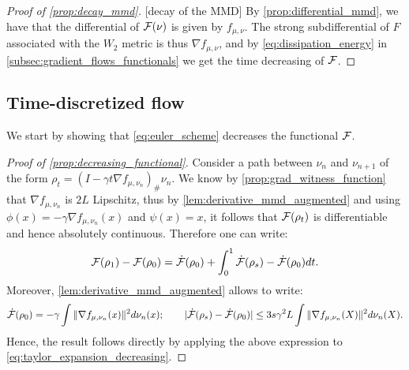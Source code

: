
\begin{proof}[Proof of \cref{prop:decay_mmd}]\label{proof:prop:decay_mmd}[decay of the MMD]
By \eqref{prop:differential_mmd}, we have that the differential of ${{\mathcal F}}(\nu)$ is given by $f_{\mu,\nu}$. The strong subdifferential of $F$ associated with the $W_2$ metric is thus $\nabla f_{\mu, \nu}$, and by \eqref{eq:dissipation_energy} in \cref{subsec:gradient_flows_functionals} we get the time decreasing of ${{\mathcal F}}$.
\end{proof}




\subsection{Time-discretized flow}\label{appendix:subsec:convegence_time_discrete}
We start by showing that \cref{eq:euler_scheme} decreases the functional ${{\mathcal F}}$.
\begin{proof}[Proof of \cref{prop:decreasing_functional}]\label{proof:prop:decreasing_functional}
	Consider a path between $\nu_n$ and $\nu_{n+1}$ of the form $\rho_t	=(I-\gamma t\nabla f_{\mu,\nu_n})_{\#}\nu_n$. We know by \cref{prop:grad_witness_function} that $\nabla f_{\mu,\nu_n}$ is $2L$ Lipschitz, thus by \cref{lem:derivative_mmd_augmented} and using $\phi(x) = -\gamma \nabla f_{\mu,\nu_n}(x)$ and $\psi(x) = x$, it follows that ${{\mathcal F}}(\rho_t)$ is differentiable and hence absolutely continuous. Therefore one can write:
	\begin{align}\label{eq:taylor_expansion_decreasing}
	\mathcal{F}(\rho_1)-\mathcal{F}(\rho_0) = \dot{\mathcal{F}}(\rho_0)+  \int_0^1 \dot{{{\mathcal F}}}(\rho_s)- \dot{{{\mathcal F}}}(\rho_0)dt.
	\end{align}
	Moreover, \cref{lem:derivative_mmd_augmented} allows to write:
	\begin{align*}
		\dot{\mathcal{F}}(\rho_0) = -\gamma \int \Vert \nabla f_{\mu,\nu_n}(x) \Vert^2 d\nu_n(x); \qquad \vert \dot{{{\mathcal F}}}(\rho_s)- \dot{{{\mathcal F}}}(\rho_0)\vert \leq 3s\gamma^2 L\int \Vert \nabla f_{\mu,\nu_n}(X) \Vert^2 d\nu_n(X).
	\end{align*} 
Hence, the result follows directly by applying the above expression to \cref{eq:taylor_expansion_decreasing}.
\end{proof}

